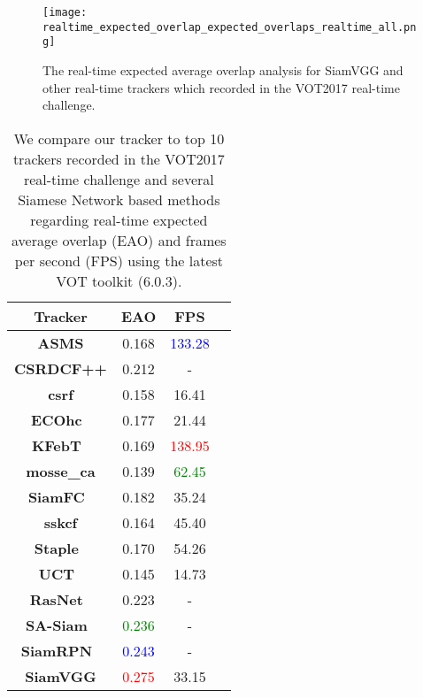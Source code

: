 \documentclass[runningheads]{llncs}
\begin{document}
\begin{figure}[h]
\centering
\texttt{[image: realtime\_expected\_overlap\_expected\_overlaps\_realtime\_all.png]}
\caption{The real-time expected average overlap analysis for SiamVGG and other real-time trackers which recorded in the VOT2017 real-time challenge.}


\label{fig:vot2017realtime}
\end{figure}




\setlength{\tabcolsep}{30pt}
\begin{table}[h!]
\begin{center}
\caption{We compare our tracker to top 10 trackers recorded in the VOT2017 real-time challenge and several Siamese Network based methods regarding real-time expected average overlap (EAO) and frames per second (FPS) using the latest VOT toolkit (6.0.3).}
\label{table:vot2017realtime}
\begin{tabular}{cccc}
\hline




\textbf{Tracker}&\textbf{EAO} & \textbf{FPS}  \\\hline
\textbf{ASMS} & 0.168 & \textcolor{blue}{133.28}  \\
\textbf{CSRDCF++} & 0.212 & -  \\
\textbf{csrf} & 0.158 &16.41 \\

\textbf{ECOhc~\cite{danelljan2017eco}} & 0.177 & 21.44  \\
\textbf{KFebT~\cite{SennaDrumBast:2017:ReEnTr}} & 0.169 & \textcolor{red}{138.95} \\
\textbf{mosse\_ca} & 0.139 & \textcolor{green}{62.45}  \\
\textbf{SiamFC~\cite{bertinetto2016fully}} & 0.182 & 35.24   \\

\textbf{sskcf} & 0.164 & 45.40 \\

\textbf{Staple~\cite{bertinetto2016staple}} & 0.170 & 54.26   \\


\textbf{UCT~\cite{zhu2017uct}} & 0.145 & 14.73\\\hline

\textbf{RasNet~\cite{wang2018learning}} & 0.223 & - \\

\textbf{SA-Siam~\cite{he2018twofold}} & \textcolor{green}{0.236}& - \\
\textbf{SiamRPN~\cite{li2018high}} & \textcolor{blue}{0.243} & -  \\\hline

\textbf{SiamVGG} &\textcolor{red}{ 0.275} & 33.15  \\\hline
\end{tabular}
\end{center}
\end{table}
\setlength{\tabcolsep}{1.4pt}
\end{document}
